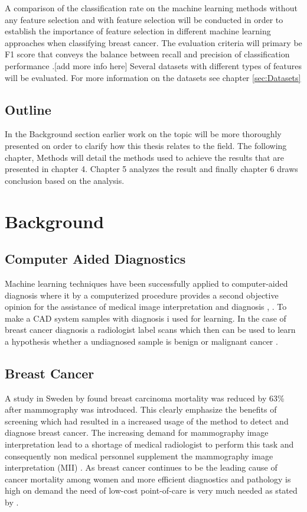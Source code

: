 \documentclass{kththesis}
\begin{document}
A comparison of the classification rate on the machine learning methods without any feature selection and with feature selection will be conducted in order to establish the importance of feature selection in different machine learning approaches when classifying breast cancer. The evaluation criteria will primary be F1 score that conveys the balance between recall and precision of classification performance \parencite{muc1992}.[add more info here] Several datasets with different types of features will be evaluated. For more information on the datasets see chapter \ref{sec:Datasets}

\section{Outline}

In the Background section earlier work on the topic will be more thoroughly presented on order to clarify how this thesis relates to the field. The following chapter, Methods will detail the methods used to achieve the results that are presented in chapter 4. Chapter 5 analyzes the result and finally chapter 6 draws conclusion based on the analysis.

\chapter{Background}

\section{Computer Aided Diagnostics}

Machine learning techniques have been successfully applied to computer-aided diagnosis where it by a computerized procedure provides a second objective opinion for the assistance of medical image interpretation and diagnosis \parencite{li2007}, \parencite{ni2016}. To make a CAD system samples with diagnosis i used for learning. In the case of breast cancer diagnosis a radiologist label scans which then can be used to learn a hypothesis whether a undiagnosed sample is benign or malignant cancer \parencite{li2007}.

\section{Breast Cancer} %

A study in Sweden by \textcite{tabar2001} found breast carcinoma mortality was reduced by 63\% after mammography was introduced. This clearly emphasize the benefits of screening which had resulted in a increased usage of the method to detect and diagnose breast cancer. The increasing demand for mammography image interpretation lead to a shortage of medical radiologist to perform this task and consequently non medical personnel supplement the mammography image interpretation (MII) \parencite{culpan2016}. As breast cancer continues to be the leading cause of cancer mortality among women and more efficient diagnostics and pathology is high on demand the need of low-cost point-of-care is very much needed as stated by \textcite{martei2018}.\\
\end{document}
